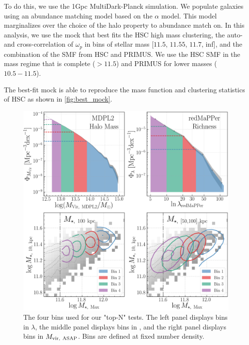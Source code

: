 \documentclass[a4paper,fleqn,usenatbib]{mnras}
\begin{document}
To do this, we use the 1Gpc MultiDark-Planck simulation. We populate galaxies using an abundance matching model based on the \citet{Lehmann2017} $\alpha$ model. This model marginalizes over the choice of the halo property to abundance match on. In this analysis, we use the mock that best fits the HSC high mass clustering, the auto- and cross-correlation of $\omega_p$ in bins of stellar mass [$11.5$, $11.55$, $11.7$, inf], and the combination of the SMF from HSC and PRIMUS. We use the HSC SMF in the mass regime that is complete ($> 11.5$) and PRIMUS for lower masses ($10.5 - 11.5$).

The best-fit mock is able to reproduce the mass function and clustering statistics of HSC as shown in \ref{fig:best_mock}.

  \begin{figure}
      \centering 
      \includegraphics[width=\textwidth]{figure/topn_bins}
      \caption{The four bins used for our "top-N" tests. The left panel displays bins in $\lambda$, the middle panel displays bins in \mmax{}, and the right panel displays bins in 
          $M_{\rm vir,\ ASAP}$. Bins are defined at fixed number density. }
      \label{fig:density_bins}
  \end{figure}
\end{document}
